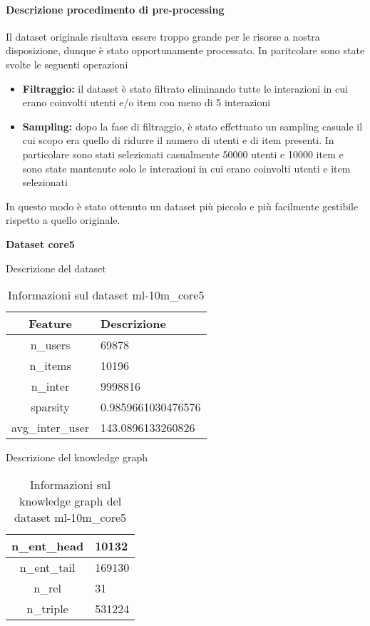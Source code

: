 \paragraph{Descrizione procedimento di pre-processing}


\noindent Il dataset originale risultava essere troppo grande per le risorse a nostra disposizione, dunque è stato opportunamente processato. In paritcolare sono state svolte le seguenti operazioni
\begin{itemize}
    \item \textbf{Filtraggio:} il dataset è stato filtrato eliminando tutte le interazioni in cui erano coinvolti utenti e/o item con meno di 5 interazioni
    \item \textbf{Sampling:} dopo la fase di filtraggio, è stato effettuato un sampling casuale il cui scopo era quello di ridurre il numero di utenti e di item presenti. In particolare sono stati selezionati casualmente 50000 utenti e 10000 item e sono state mantenute solo le interazioni in cui erano coinvolti utenti e item selezionati
\end{itemize}

\noindent In questo modo è stato ottenuto un dataset più piccolo e più facilmente gestibile rispetto a quello originale.

\noindent\textbf{Dataset core5}

\noindent Descrizione del dataset
\begin{table}[H]
    \centering
    \footnotesize
    \begin{tabularx}{\textwidth}{|c|X|}
        \hline
        \textbf{Feature} & \textbf{Descrizione} \\
        \hline
        n\_users & 69878 \\
        \hline
        n\_items & 10196 \\
        \hline
        n\_inter & 9998816 \\
        \hline
        sparsity & 0.9859661030476576 \\
        \hline
        avg\_inter\_user & 143.0896133260826 \\
        \hline
    \end{tabularx}
    \caption{Informazioni sul dataset ml-10m\_core5}
    \label{tab:dataset_info}
\end{table}


\noindent Descrizione del knowledge graph
\begin{table}[H]
    \centering
    \footnotesize
    \begin{tabularx}{\textwidth}{|c|X|}
        \hline
        n\_ent\_head & 10132 \\
        \hline
        n\_ent\_tail & 169130 \\
        \hline
        n\_rel & 31 \\
        \hline
        n\_triple & 531224 \\
        \hline
    \end{tabularx}
    \caption{Informazioni sul knowledge graph del dataset ml-10m\_core5}
    \label{tab:dataset_info}
\end{table}



